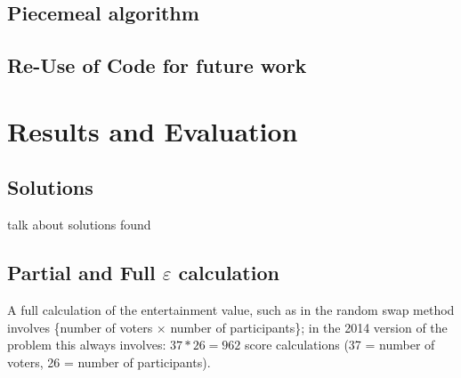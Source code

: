 \documentclass[12pt]{report}
\begin{document}
\subsection{Piecemeal algorithm}\label{Imp-Piecemeal}
\subsection{Re-Use of Code for future work}\label{Imp-Reuse}

\section{Results and Evaluation}\label{Results}
\subsection{Solutions}
talk about solutions found

\subsection{Partial and Full $\varepsilon$ calculation}\label{eCalc}
A full calculation of the entertainment value, such as in the random swap method involves \{number of voters $\times$ number of participants\}; in the 2014 version of the problem this always involves: $37 * 26 = 962$ score calculations (37 = number of voters, 26 = number of participants).
\end{document}
